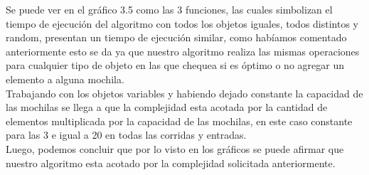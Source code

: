 Se puede ver en el gr\'afico 3.5 como las 3 funciones, las cuales simbolizan el tiempo de ejecuci\'on del algoritmo con todos los objetos iguales, todos distintos y random, presentan un tiempo de ejecuci\'on similar, como hab\'iamos comentado anteriormente esto se da ya que nuestro algoritmo realiza las mismas operaciones para cualquier tipo de objeto en las que chequea si es \'optimo o no agregar un elemento a alguna mochila.\\

Trabajando con los objetos variables y habiendo dejado constante la capacidad de las mochilas se llega a que la complejidad esta acotada por la cantidad de elementos multiplicada por la capacidad de las mochilas, en este caso constante para las 3 e igual a 20 en todas las corridas y entradas.\\

Luego, podemos concluir que por lo visto en los gr\'aficos se puede afirmar que nuestro algoritmo esta acotado por la complejidad solicitada anteriormente.\\